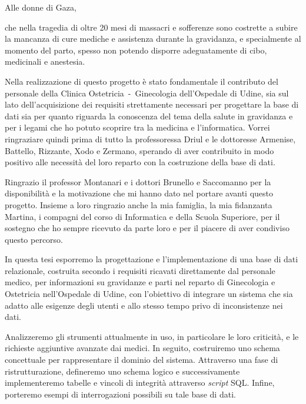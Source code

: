 \begin{dedication}
Alle donne di Gaza,
\par che nella tragedia di oltre 20 mesi di massacri e sofferenze sono costrette a subire la mancanza di cure mediche e assistenza durante la gravidanza, e specialmente al momento del parto, spesso non potendo disporre adeguatamente di cibo, medicinali e anestesia.
\end{dedication}

\acknowledgements
Nella realizzazione di questo progetto è stato fondamentale il contributo del personale della Clinica Ostetricia~-~Ginecologia dell'Ospedale di Udine, sia sul lato dell'acquisizione dei requisiti strettamente necessari per progettare la base di dati sia per quanto riguarda la conoscenza del tema della salute in gravidanza e per i legami che ho potuto scoprire tra la medicina e l'informatica.
Vorrei ringraziare quindi prima di tutto la professoressa Driul e le dottoresse Armenise, Battello, Rizzante, Xodo e Zermano, sperando di aver contribuito in modo positivo alle necessità del loro reparto con la costruzione della base di dati.

Ringrazio il professor Montanari e i dottori Brunello e Saccomanno per la disponibilità e la motivazione che mi hanno dato nel portare avanti questo progetto.
Insieme a loro ringrazio anche la mia famiglia, la mia fidanzanta Martina, i compagni del corso di Informatica e della Scuola Superiore, per il sostegno che ho sempre ricevuto da parte loro e per il piacere di aver condiviso questo percorso.

\abstract
In questa tesi esporremo la progettazione e l'implementazione di una base di dati relazionale, costruita secondo i requisiti ricavati direttamente dal personale medico, per informazioni su gravidanze e parti nel reparto di Ginecologia e Ostetricia nell'Ospedale di Udine, con l'obiettivo di integrare un sistema che sia adatto alle esigenze degli utenti e allo stesso tempo privo di inconsistenze nei dati.

Analizzeremo gli strumenti attualmente in uso, in particolare le loro criticità, e le richieste aggiuntive avanzate dai medici. In seguito, costruiremo uno schema concettuale per rappresentare il dominio del sistema. Attraverso una fase di ristrutturazione, defineremo uno schema logico e successivamente implementeremo tabelle e vincoli di integrità attraverso \emph{script} SQL. Infine, porteremo esempi di interrogazioni possibili su tale base di dati.